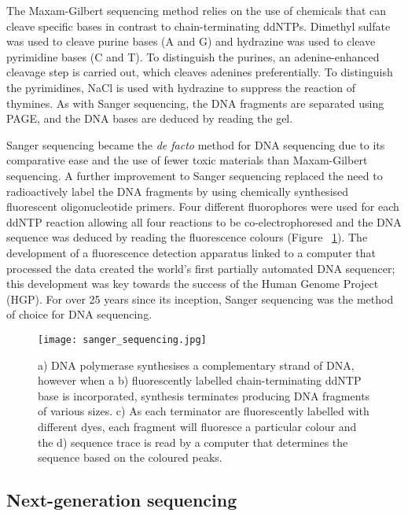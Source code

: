 The Maxam-Gilbert sequencing method\cite{pmid265521} relies on the use of chemicals that can cleave specific bases in contrast to chain-terminating ddNTPs. Dimethyl sulfate was used to cleave purine bases (A and G) and hydrazine was used to cleave pyrimidine bases (C and T). To distinguish the purines, an adenine-enhanced cleavage step is carried out, which cleaves adenines preferentially. To distinguish the pyrimidines, NaCl is used with hydrazine to suppress the reaction of thymines. As with Sanger sequencing, the DNA fragments are separated using PAGE, and the DNA bases are deduced by reading the gel.

Sanger sequencing became the \textit{de facto} method for DNA sequencing due to its comparative ease and the use of fewer toxic materials than Maxam-Gilbert sequencing. A further improvement to Sanger sequencing replaced the need to radioactively label the DNA fragments by using chemically synthesised fluorescent oligonucleotide primers\cite{pmid3713851}. Four different fluorophores were used for each ddNTP reaction allowing all four reactions to be co-electrophoresed and the DNA sequence was deduced by reading the fluorescence colours (Figure ~\ref{fig:sanger_sequencing}). The development of a fluorescence detection apparatus linked to a computer that processed the data created the world's first partially automated DNA sequencer\cite{pmid3713851}; this development was key towards the success of the Human Genome Project (HGP). For over 25 years since its inception, Sanger sequencing was the method of choice for DNA sequencing.

\begin{figure}[!ht]
   \centering
   \texttt{[image: sanger\_sequencing.jpg]}
   \caption[Sanger sequencing]{a) DNA polymerase synthesises a complementary strand of DNA, however when a b) fluorescently labelled chain-terminating ddNTP base is incorporated, synthesis terminates producing DNA fragments of various sizes. c) As each terminator are fluorescently labelled with different dyes, each fragment will fluoresce a particular colour and the d) sequence trace is read by a computer that determines the sequence based on the coloured peaks.}
   \label{fig:sanger_sequencing}
\end{figure}

\subsection{Next-generation sequencing}

